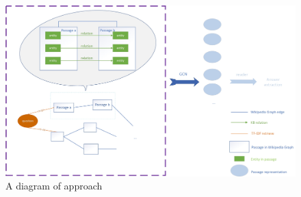 \documentclass[sigconf]{acmart}
\begin{document}
	\begin{figure}[ht]		
		\centering
		\includegraphics[scale=0.6]{f1.jpg}
		\caption{A diagram of approach}
		\label{fig:label}
	\end{figure}
	
	
	
	
	
	
	
	
	
\end{document}
